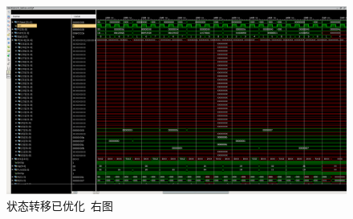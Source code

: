 \documentclass[12pt,a4paper]{article}
\begin{document}
\begin{figure}[h]
	\centering
	\includegraphics[width=\textwidth]{seq4}
	\caption{状态转移已优化~右图}
	\label{fig:seq2-2}
\end{figure}
\end{document}
